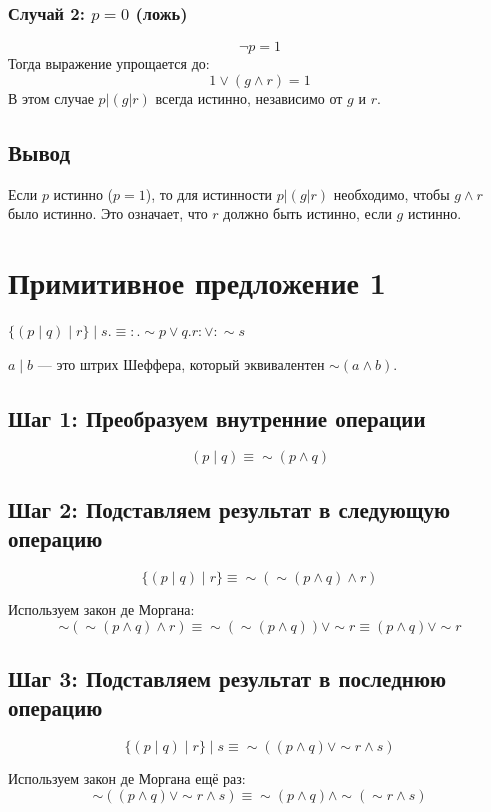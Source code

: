 \documentclass[a4paper, 12pt]{article}
\begin{document}
\subsubsection*{Случай 2: \( p = 0 \) (ложь)}
\[
\neg p = 1
\]
Тогда выражение упрощается до:
\[
1 \lor (g \land r) = 1
\]
В этом случае \( p | (g | r) \) всегда истинно, независимо от \( g \) и \( r \).

\subsection*{Вывод}
Если \( p \) истинно (\( p = 1 \)), то для истинности \( p | (g | r) \) необходимо, чтобы \( g \land r \) было истинно. Это означает, что \( r \) должно быть истинно, если \( g \) истинно.

\section{Примитивное предложение 1}
$\lbrace (p \mid q) \mid r \rbrace \mid s .\equiv :. \sim p \vee q.r: \vee : \sim s$

$a \mid b$ — это штрих Шеффера, который эквивалентен $\sim (a \wedge b)$.

\subsection*{Шаг 1: Преобразуем внутренние операции}
\[(p \mid q) \equiv \sim (p \wedge q)\]

\subsection*{Шаг 2: Подставляем результат в следующую операцию}

\[\lbrace (p \mid q) \mid r \rbrace \equiv \sim \left( \sim (p \wedge q) \wedge r \right) \]

Используем закон де Моргана:
\[\sim \left( \sim (p \wedge q) \wedge r \right) \equiv \sim (\sim (p \wedge q)) \vee \sim r \equiv (p \wedge q) \vee \sim r\]

\subsection*{Шаг 3: Подставляем результат в последнюю операцию}
\[\lbrace (p \mid q) \mid r \rbrace \mid s \equiv \sim \left( (p \wedge q) \vee \sim r \wedge s \right)\]

Используем закон де Моргана ещё раз:
\[\sim \left( (p \wedge q) \vee \sim r \wedge s \right) \equiv \sim (p \wedge q) \wedge \sim (\sim r \wedge s)\]
\end{document}

